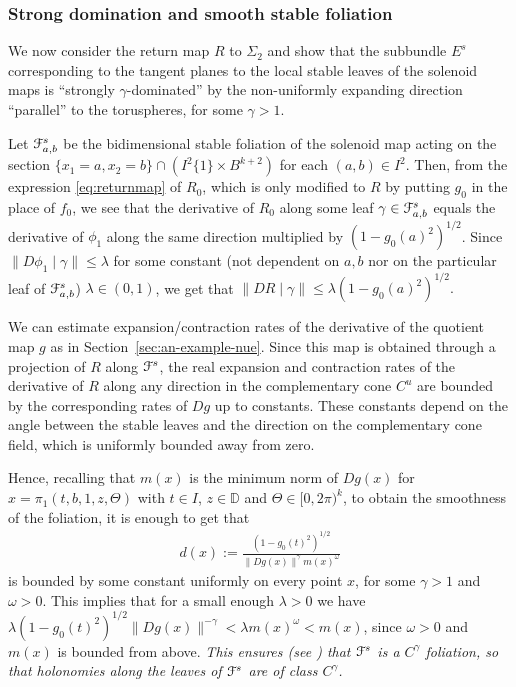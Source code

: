 \documentclass[reqno,12pt,a4paper]{amsart}
\theoremstyle{plain}
\theoremstyle{definition}
\begin{document}
\subsubsection{Strong domination and smooth stable foliation}
\label{sec:dominat-splitt}

We now consider the return map $R$ to $\Sigma_2$ and show
that the subbundle $E^{s}$ corresponding to the tangent
planes to the local stable leaves of the solenoid maps is
``strongly $\gamma$-dominated'' by the non-uniformly
expanding direction ``parallel'' to the toruspheres, for
some $\gamma>1$.

Let ${\EuScript{F}}^{s}_{a,b}$ be the bidimensional stable foliation
of the solenoid map acting on the section
$\{x_1=a,x_2=b\}\cap (I^2\{1\}\times B^{k+2})$ for
each $(a,b)\in I^2$. Then, from the expression
\eqref{eq:returnmap} of $R_0$, which is only modified to $R$
by putting $g_0$ in the place of $f_0$, we see that
the derivative of $R_0$ along some leaf
$\gamma\in{\EuScript{F}}^{s}_{a,b}$ equals the derivative of $\phi_1$
along the same direction multiplied by $(1-g_0(a)^2)^{1/2}$.
Since $\|D\phi_1\mid\gamma\|\le\lambda$ for some constant
(not dependent on $a,b$ nor on the particular leaf of
${\EuScript{F}}^{s}_{a,b}$) $\lambda\in(0,1)$, we get that
$\|DR\mid\gamma\|\le\lambda(1-g_0(a)^2)^{1/2}.$

We can estimate expansion/contraction rates of the
derivative of the quotient map $g$ as in
Section~\ref{sec:an-example-nue}. Since this map is obtained
through a projection of $R$ along ${\EuScript{F}}^{s}$, the real
expansion and contraction rates of the derivative of $R$
along any direction in the complementary cone $C^u$ are
bounded by the corresponding rates of $Dg$ up to
constants. These constants depend on the angle between the
stable leaves and the direction on the complementary cone
field, which is uniformly bounded away from zero.

Hence, recalling that $m(x)$ is the minimum norm  of
$Dg(x)$ for $x=\pi_1(t,b,1,z,\Theta)$ with $t\in I$,
$z\in{{\mathbb D}}$ and $\Theta\in[0,2\pi)^k$, to obtain the
smoothness of the foliation, it is enough to get that
\begin{align}
  \label{eq:domination}
  d(x):=\frac{(1-g_0(t)^2)^{1/2}}{\|Dg(x)\|^\gamma m(x)^\omega}
\end{align}
is bounded by some constant uniformly on every point $x$, for some
$\gamma>1$ and $\omega>0$. This implies that for a small
enough $\lambda>0$ we have
$  \lambda(1-g_0(t)^2)^{1/2}\|Dg(x)\|^{-\gamma}<
  \lambda m(x)^\omega < m(x)$,
since $\omega>0$ and $m(x)$ is  bounded from above.
\emph{This ensures (see \cite[Theorem
6.2]{HP70}) that ${\EuScript{F}}^{s}$ is a $C^\gamma$ foliation, so
that holonomies  along the leaves of ${\EuScript{F}}^{s}$ are of class
$C^\gamma$.}
\end{document}
